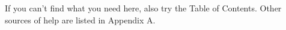 \documentclass[11pt]{article}
\begin{document}
\setcounter{page}{1}
\pagebreak
\renewcommand{\thepage}{I-\arabic{page}}
If you can't find what you need here, also try the Table of Contents.
Other sources of help are listed in Appendix A. 


\end{document}
